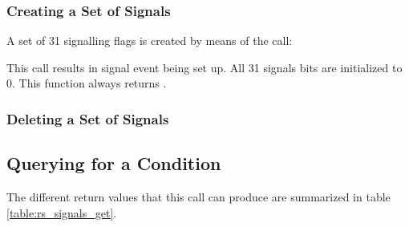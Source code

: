 
\subsubsection{Creating a Set of Signals}

A set of 31 signalling flags is created by means of the call:\\


This call results in signal event being set up. All 31 signals bits are initialized to
0. This function always returns . 

\subsubsection{Deleting a Set of Signals}

\subsection{Querying for a Condition}


The different return values that this call can produce are summarized in
table \ref{table:rs_signals_get}.


